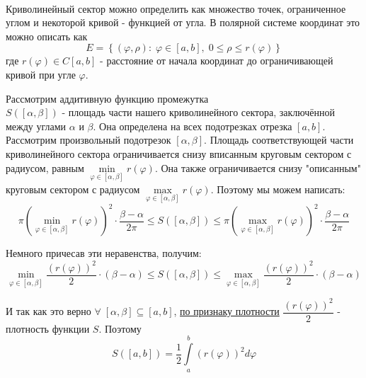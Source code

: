 \documentclass[../main.tex]{subfiles}
\begin{document}
\begin{example}
    
    ~

    Криволинейный сектор можно определить как множество точек, ограниченное углом и некоторой кривой - функцией от угла. В полярной системе координат это можно описать как 
    \[ E=\left\{ \left( \varphi , \rho\right): \; \varphi \in \left[ a , b \right],\; 0 \leq \rho \leq r\left( \varphi \right)\right\}\]
    где \( r\left( \varphi \right) \in C\left[ a , b \right]\) - расстояние от начала координат до ограничивающей кривой при угле \( \varphi \).


    Рассмотрим аддитивную функцию промежутка \\
    \( S(\left[ \alpha , \beta \right])\) - площадь части нашего криволинейного сектора, заключённой между 
    углами \( \alpha \) и \( \beta \). Она определена на всех подотрезках отрезка \( \left[ a,b\right]\). Рассмотрим произвольный подотрезок \( \left[ \alpha , \beta \right]\).
    Площадь соответствующей части криволинейного сектора ограничивается снизу вписанным круговым сектором с радиусом, равным \( \min\limits_{ \varphi \in \left[ \alpha , \beta \right]} r\left( \varphi \right)\). 
    Она также ограничивается снизу "описанным"  круговым сектором с радиусом \( \max\limits_{ \varphi \in \left[ \alpha , \beta \right]} r\left( \varphi \right)\). Поэтому мы можем написать:
    \[ \pi \left( \min\limits_{ \varphi \in \left[ \alpha , \beta \right]} r\left( \varphi \right) \right)^2\cdot \dfrac{ \beta-\alpha}{ 2 \pi } \leq S(\left[ \alpha , \beta \right]) \leq \pi \left( \max\limits_{ \varphi \in \left[ \alpha , \beta \right]} r\left( \varphi \right) \right)^2\cdot \dfrac{ \beta-\alpha}{ 2 \pi }\]

    Немного причесав эти неравенства, получим:
    \[ \min\limits_{ \varphi \in \left[ \alpha , \beta \right]} \dfrac{ (r\left(\varphi\right))^2}{ 2}\cdot \left( \beta - \alpha \right) \leq S(\left[ \alpha , \beta \right]) \leq \max\limits_{ \varphi \in \left[ \alpha , \beta \right]} \dfrac{ (r\left(\varphi\right))^2}{ 2}\cdot \left( \beta - \alpha \right)\]

    И так как это верно \( \forall \; \left[ \alpha , \beta \right] \subseteq  \left[ a,b\right]\), \hyperlink{thm:density}{по признаку плотности} \( \dfrac{ (r\left(\varphi\right))^2}{ 2}\) - плотность функции \( S\). Поэтому
    \[ \boxed{ S\left( \left[ a,b\right]\right)= \dfrac{ 1}{ 2}\displaystyle\int\limits_{ a}^{ b}\left( r\left( \varphi \right)\right)^2d \varphi }\]
\end{example}
\end{document}
